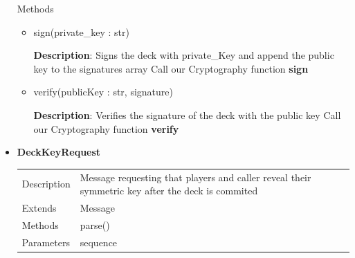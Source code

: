 \documentclass[11pt]{article}
\begin{document}
\begin{itemize}
  Methods 
  \begin{itemize}
  
	\item sign(private\_key : str)

  \textbf{Description}: Signs the deck with private\_Key and append the
  public key to the signatures array Call our Cryptography function
  \textbf{sign}

  \item verify(publicKey : str, signature)

  \textbf{Description}: Verifies the signature of the deck with the
  public key Call our Cryptography function \textbf{verify}  
  
  \end{itemize}
 
\item
  \textbf{DeckKeyRequest}

  \begin{longtable}[]{@{}ll@{}}
  \toprule
  \endhead
  \begin{minipage}[t]{0.40\columnwidth}\raggedright
  Description\strut
  \end{minipage} & \begin{minipage}[t]{0.54\columnwidth}\raggedright
  Message requesting that players and caller reveal their symmetric key
  after the deck is commited\strut
  \end{minipage}\tabularnewline
  \begin{minipage}[t]{0.40\columnwidth}\raggedright
  Extends\strut
  \end{minipage} & \begin{minipage}[t]{0.54\columnwidth}\raggedright
  Message\strut
  \end{minipage}\tabularnewline
  \begin{minipage}[t]{0.40\columnwidth}\raggedright
  Methods\strut
  \end{minipage} & \begin{minipage}[t]{0.54\columnwidth}\raggedright
  parse()\strut
  \end{minipage}\tabularnewline
  \begin{minipage}[t]{0.40\columnwidth}\raggedright
  Parameters\strut
  \end{minipage} & \begin{minipage}[t]{0.54\columnwidth}\raggedright
  sequence\strut
  \end{minipage}\tabularnewline
  \bottomrule
  \end{longtable}



\end{itemize}
\end{document}
